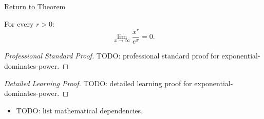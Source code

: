 \newpage
{}
\label{prf:exponential-dominates-power}

\begin{remark*}[Return]
\hyperref[prop:exponential-dominates-power]{Return to Theorem}
\end{remark*}

\begin{proposition*}
For every $r > 0$:
\[
  \lim_{x \to \infty} \frac{x^r}{e^x} = 0.
\]

\smallskip\noindent
\end{proposition*}

\begin{proof}[Professional Standard Proof]
\LRAProofBodyStart
TODO: professional standard proof for exponential-dominates-power.
\end{proof}

\begin{proof}[Detailed Learning Proof]
\LRAProofBodyStart
TODO: detailed learning proof for exponential-dominates-power.
\end{proof}

\begin{remark*}
\end{remark*}

\begin{dependencies}
\begin{itemize}
  \item TODO: list mathematical dependencies.
\end{itemize}
\end{dependencies}

\clearpage
